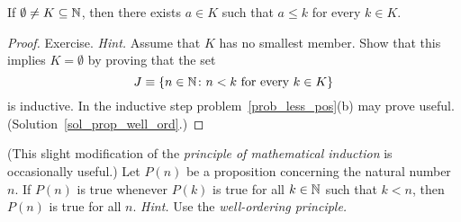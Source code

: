\begin{prop}\label{prop_well_ord}  If $\emptyset \ne K \subseteq \mathbb{N}$, then there exists
$a \in K$ such that $a \le k$ for every $k \in K$.
\end{prop}

\begin{proof}  Exercise. \emph{Hint.}  Assume that $K$ has no smallest member.  Show that
this implies $K = \emptyset$ by proving that the set
  \[ J \equiv \{n \in \mathbb{N} \colon n < k  \text{ for every } k \in K\} \]
is inductive.  In the inductive step problem~\ref{prob_less_pos}(b) may prove useful.
(Solution~\ref{sol_prop_well_ord}.)  \ns
\end{proof}

\begin{prob}  (This slight modification of the \emph{principle of mathematical induction}
is occasionally useful.)  Let $P(n)$ be a proposition concerning the natural number $n$. If
$P(n)$ is true whenever $P(k)$ is true for all $k \in \mathbb{N}$ such that $k < n$, then $P(n)$ is
true for all $n$.  \emph{Hint.}  Use the \emph{well-ordering principle.}
\end{prob}



\endinput
